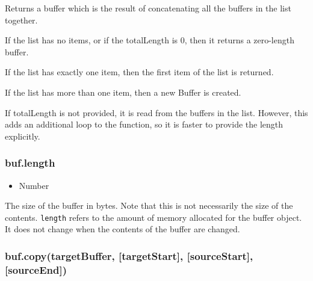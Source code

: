 Returns a buffer which is the result of concatenating all the buffers in
the list together.

If the list has no items, or if the totalLength is 0, then it returns a
zero-length buffer.

If the list has exactly one item, then the first item of the list is
returned.

If the list has more than one item, then a new Buffer is created.

If totalLength is not provided, it is read from the buffers in the list.
However, this adds an additional loop to the function, so it is faster
to provide the length explicitly.

\subsubsection{buf.length}

\begin{itemize}
\item
  Number
\end{itemize}

The size of the buffer in bytes. Note that this is not necessarily the
size of the contents. \texttt{length} refers to the amount of memory
allocated for the buffer object. It does not change when the contents of
the buffer are changed.

\begin{Shaded}
\begin{Highlighting}[]
 \NormalTok{);}

\NormalTok{(}\NormalTok{);}
\NormalTok{(}\NormalTok{, }\NormalTok{, }\NormalTok{);}
\NormalTok{(}\NormalTok{);}

\end{Highlighting}
\end{Shaded}

\subsubsection{buf.copy(targetBuffer, {[}targetStart{]},
{[}sourceStart{]}, {[}sourceEnd{]})}

